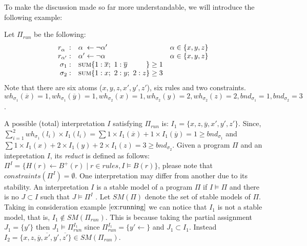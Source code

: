 To make the discussion made so far more understandable, we will introduce the following example:
\begin{example}
    \label{ex:running}
    Let $\Pi_{\mathit{run}}$ be the following:
    \begin{align*}
        \begin{array}{rll}
            r_{\alpha\phantom{'}}: & \alpha\phantom{'} \leftarrow \neg \alpha' & \alpha \in \{x,y,z\}\\
            r_{\alpha'}: & \alpha' \leftarrow \neg \alpha & \alpha \in \{x,y,z\}\\ 
            \sigma_{1}: & \textsc{sum}\{
                1 : \overline{x};\ 1 : \overline{y}\phantom{;\ 2 : z}
            \} \geq 1 \\
            \sigma_{2}: & \textsc{sum}\{
                1 : x;\ 2 : y;\ 2 : z
            \} \geq 3
        \end{array}
    \end{align*}
Note that there are six atoms ($x,y,z,x',y',z'$), six rules and two constraints.
$\mathit{wh}_{\sigma_1}(\overline{x}) = 1, \mathit{wh}_{\sigma_1}(\overline{y}) = 1,
\mathit{wh}_{\sigma_2}(x) = 1,\mathit{wh}_{\sigma_2}(y) = 2,
\mathit{wh}_{\sigma_2}(z) = 2, \mathit{bnd}_{\sigma_1}=1,\mathit{bnd}_{\sigma_2}=3$.
\end{example}
A possible (total) interpretation $I$ satisfying $\Pi_{\mathit{run}}$ is:
$I_1 = \{ x, z, \overline{y}, x', y', z' \}$.
Since, $\sum_{i=1}^{2} \mathit{wh}_{\sigma_1}(l_i) \times I_1(l_i) = 
\sum 1 \times I_1(\overline{x}) + 1 \times I_1(\overline{y}) = 1 \ge \mathit{bnd}_{\sigma_1}$
and $\sum 1 \times I_1(x) + 2 \times I_1(y) + 2 \times I_1(z) = 3 \ge \mathit{bnd}_{\sigma_2}$.
Given a program $\Pi$ and an intepretation $I$, its \textit{reduct} is
defined as follows: $\Pi^{I} = \{ H(r) \leftarrow B^+(r) \mid r \in \mathit{rules}, I \models B(r)\}$,
please note that $\mathit{constraints}(\Pi^{I}) = \emptyset$.
One interpretation may differ from another due to its stability.
An interpretation $I$ is a stable model of a program $\Pi$ if $I \models \Pi$ and there is 
no $J \subset I$ such that $J \models \Pi^I$ .
Let $\mathit{SM}(\Pi)$ denote the set of stable models of $\Pi$.
Taking in consideration example $\ref{ex:running}$ we can notice that 
$I_1$ is not a stable model, that is, $I_1 \not\in \mathit{SM}(\Pi_{\mathit{run}})$.
This is because taking the partial assignment $J_1 = \{y'\}$
then $ J_1  \models \Pi_{\mathit{run}}^{I_1}$ since $\Pi_{\mathit{run}}^{I_1} = \{ y' \leftarrow  \}$
and $J_1 \subset I_1$.
Instead $I_2 = \{ x, z, \overline{y}, \overline{x'}, y', \overline{z'} \} \in \mathit{SM}(\Pi_{\mathit{run}})$.

